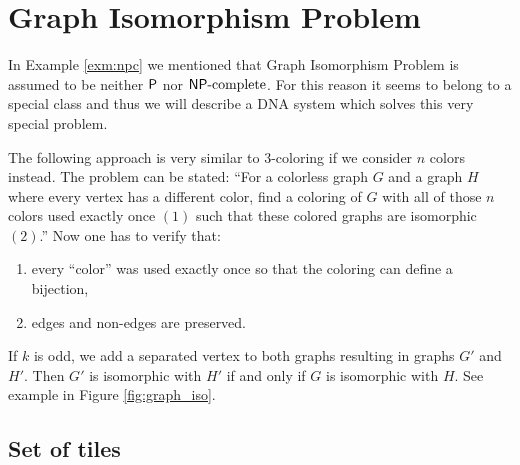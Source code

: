 \section{Graph Isomorphism Problem}

In Example \ref{exm:npc} we mentioned that Graph Isomorphism Problem is assumed to be neither $\P$ nor $\NPC$. For this reason it seems to belong to a special class and thus we will describe a DNA system which solves this very special problem.

The following approach is very similar to 3-coloring if we consider $n$ colors instead. The problem can be stated: ``For a colorless graph $G$ and a graph $H$ where every vertex has a different color, find a coloring of $G$ with all of those $n$ colors used exactly once $(1)$ such that these colored graphs are isomorphic $(2)$.'' Now one has to verify that:
\begin{enumerate}[(1)]
	\item every ``color'' was used exactly once so that the coloring can define a bijection,
	\item edges and non-edges are preserved.
\end{enumerate}

If $k$ is odd, we add a separated vertex to both graphs resulting in graphs $G'$ and $H'$. Then $G'$ is isomorphic with $H'$ if and only if $G$ is isomorphic with $H$. See example in Figure \ref{fig:graph_iso}.

\subsection*{Set of tiles}

